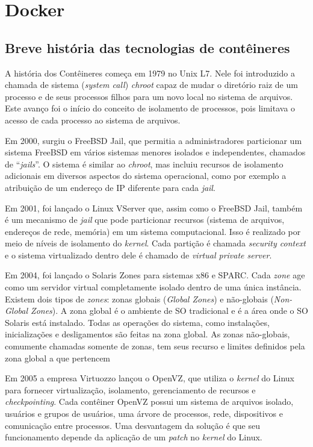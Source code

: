 \documentclass[twosideprint]{politex}
\begin{document}
	\section{Docker}
	\subsection{Breve história das tecnologias de contêineres}
	A história dos Contêineres começa em 1979 no Unix L7. Nele foi introduzido a chamada de sistema (\textit{system call}) \textit{chroot} capaz de mudar o diretório raiz de um processo e de seus processos filhos para um novo local no sistema de arquivos. Este avanço foi o início do conceito de isolamento de processos, pois limitava o acesso de cada processo ao sistema de arquivos. 

	Em 2000, surgiu o FreeBSD Jail, que permitia a administradores particionar um sistema FreeBSD em vários sistemas menores isolados e independentes, chamados de “\textit{jails}”. O sistema é similar ao \textit{chroot}, mas incluiu recursos de isolamento adicionais em diversos aspectos do sistema operacional, como por exemplo a atribuição de um endereço de IP diferente para cada \textit{jail}. \cite{abriefhistoryofcontainers}

	Em 2001, foi lançado o Linux VServer que, assim como o FreeBSD Jail, também é um mecanismo de \textit{jail} que pode particionar recursos (sistema de arquivos, endereços de rede, memória) em um sistema computacional. Isso é realizado por meio de níveis de isolamento do \textit{kernel}. Cada partição é chamada \textit{security context} e o sistema virtualizado dentro dele é chamado de \textit{virtual private server}. \cite{linuxvserver}

	Em 2004, foi lançado o Solaris Zones para sistemas x86 e SPARC. Cada \textit{zone} age como um servidor virtual completamente isolado dentro de uma única instância. Existem dois tipos de \textit{zones}: zonas globais (\textit{Global Zones}) e não-globais (\textit{Non-Global Zones}). A zona global é o ambiente de SO tradicional e é a área onde o SO Solaris está instalado. Todas as operações do sistema, como instalações, inicializações e desligamentos são feitas na zona global. As zonas não-globais, comumente chamadas somente de zonas, tem seus recurso e limites definidos pela zona global a que pertencem  \cite{introductiontosolariszone}

	Em 2005 a empresa Virtuozzo lançou o OpenVZ, que utiliza o \textit{kernel} do Linux para fornecer virtualização, isolamento, gerenciamento de recursos e \textit{checkpointing}. Cada contêiner OpenVZ possui um sistema de arquivos isolado, usuários e grupos de usuários, uma árvore de processos, rede, dispositivos e comunicação entre processos. Uma desvantagem da solução é que seu funcionamento depende da aplicação de um \textit{patch} no \textit{kernel} do Linux. \cite{openvz}
\end{document}
